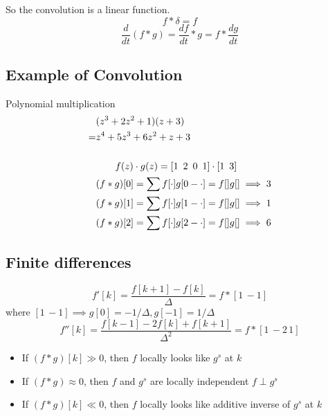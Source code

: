 \documentclass[11pt]{article}
\begin{document}
    So the convolution is a linear function. \\
    $$f*\delta = f$$
    $$\frac{d}{dt}(f*g) = \frac{df}{dt}*g = f*\frac{dg}{dt}$$

\subsection{Example of Convolution}
    Polynomial multiplication
    \begin{equation*}
        \begin{split}
            &(z^3+2z^2+1)(z+3)\\
            =&z^4 + 5z^3 + 6z^2 + z + 3\\ \\
                 &\hspace{2em} f(z) \cdot g(z) = [1 \hspace{0.5em} 2 \hspace{0.5em} 0 \hspace{0.5em} 1] \cdot [1 \hspace{0.5em} 3] \\
            &(f*g)[0] = \sum f[\cdot]g[0-\cdot] = f[]g[] \implies 3\\
            &(f*g)[1] = \sum f[\cdot]g[1-\cdot] = f[]g[] \implies 1\\
            &(f*g)[2] = \sum f[\cdot]g[2-\cdot] = f[]g[] \implies 6			
        \end{split}
    \end{equation*}
 
\subsection{Finite differences}

    $$f'[k] = \frac{f[k+1] - f[k]}{\Delta}= f*[1\,-1]$$ where $[1\,-1] \implies g[0]=-1/\Delta, g[-1] = 1/\Delta$
    $$f''[k] = \frac{f[k-1]-2f[k]+f[k+1]}{\Delta^2}= f*[1\,-2\,1]$$
    \begin{itemize}
    \item If $(f*g)[k] \gg 0$,
	then $f$ locally looks like $g^s$ at $k$\\
    \item If $ (f*g) \approx 0$,  
	then $f$ and $g^s$ are locally independent
	$f\perp g^s$ \\
    \item If $(f*g)[k] \ll 0$,
	then $f$ locally looks like additive inverse of $g^s$ at $k$\\
 \end{itemize}
 
\end{document}
